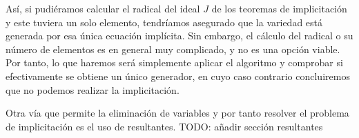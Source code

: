 Así, si pudiéramos calcular el radical del ideal $J$ de los teoremas de implicitación y este tuviera un solo elemento, tendríamos asegurado que la variedad está generada por esa única ecuación implícita. Sin embargo, el cálculo del radical o su número de elementos es en general muy complicado, y no es una opción viable. Por tanto, lo que haremos será simplemente aplicar el algoritmo y comprobar si efectivamente se obtiene un único generador, en cuyo caso contrario concluiremos que no podemos realizar la implicitación.\newline

Otra vía que permite la eliminación de variables y por tanto resolver el problema de implicitación es el uso de resultantes.
TODO: añadir sección resultantes
